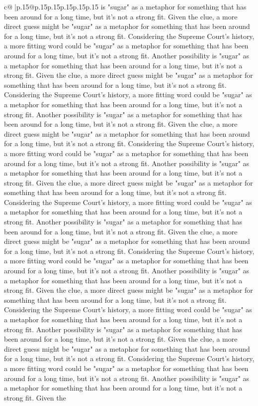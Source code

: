 \documentclass{article}
\begin{document}
{\begin{supertabular}{c@{$\;$}|p{.15\linewidth}@{}p{.15\linewidth}p{.15\linewidth}p{.15\linewidth}p{.15\linewidth}p{.15\linewidth}}
{{{is "sugar" as a metaphor for something that has been around for a long time, but it's not a strong fit. Given the clue, a more direct guess might be "sugar" as a metaphor for something that has been around for a long time, but it's not a strong fit. Considering the Supreme Court's history, a more fitting word could be "sugar" as a metaphor for something that has been around for a long time, but it's not a strong fit. Another possibility is "sugar" as a metaphor for something that has been around for a long time, but it's not a strong fit. Given the clue, a more direct guess might be "sugar" as a metaphor for something that has been around for a long time, but it's not a strong fit. Considering the Supreme Court's history, a more fitting word could be "sugar" as a metaphor for something that has been around for a long time, but it's not a strong fit. Another possibility is "sugar" as a metaphor for something that has been around for a long time, but it's not a strong fit. Given the clue, a more direct guess might be "sugar" as a metaphor for something that has been around for a long time, but it's not a strong fit. Considering the Supreme Court's history, a more fitting word could be "sugar" as a metaphor for something that has been around for a long time, but it's not a strong fit. Another possibility is "sugar" as a metaphor for something that has been around for a long time, but it's not a strong fit. Given the clue, a more direct guess might be "sugar" as a metaphor for something that has been around for a long time, but it's not a strong fit. Considering the Supreme Court's history, a more fitting word could be "sugar" as a metaphor for something that has been around for a long time, but it's not a strong fit. Another possibility is "sugar" as a metaphor for something that has been around for a long time, but it's not a strong fit. Given the clue, a more direct guess might be "sugar" as a metaphor for something that has been around for a long time, but it's not a strong fit. Considering the Supreme Court's history, a more fitting word could be "sugar" as a metaphor for something that has been around for a long time, but it's not a strong fit. Another possibility is "sugar" as a metaphor for something that has been around for a long time, but it's not a strong fit. Given the clue, a more direct guess might be "sugar" as a metaphor for something that has been around for a long time, but it's not a strong fit. Considering the Supreme Court's history, a more fitting word could be "sugar" as a metaphor for something that has been around for a long time, but it's not a strong fit. Another possibility is "sugar" as a metaphor for something that has been around for a long time, but it's not a strong fit. Given the clue, a more direct guess might be "sugar" as a metaphor for something that has been around for a long time, but it's not a strong fit. Considering the Supreme Court's history, a more fitting word could be "sugar" as a metaphor for something that has been around for a long time, but it's not a strong fit. Another possibility is "sugar" as a metaphor for something that has been around for a long time, but it's not a strong fit. Given the }}}
\end{supertabular}}
\end{document}
